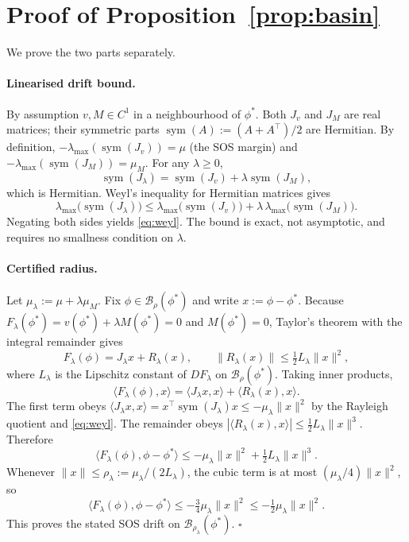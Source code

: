 \documentclass{article}
\theoremstyle{plain}
\theoremstyle{definition}
\theoremstyle{remark}
\newcommand{\B}{\mathcal{B}}
\begin{document}
\section{Proof of Proposition~\ref{prop:basin}}\label{app:prop-basin}

We prove the two parts separately.

\paragraph{Linearised drift bound.}
By assumption $v,M\in C^1$ in a neighbourhood of $\phi^\ast$. Both $J_v$ and $J_M$ are real matrices; their symmetric parts $\operatorname{sym}(A):=(A+A^\top)/2$ are Hermitian. By definition, $-\lambda_{\max}(\operatorname{sym}(J_v))=\mu$ (the SOS margin) and $-\lambda_{\max}(\operatorname{sym}(J_M))=\mu_M$. For any $\lambda\ge 0$,
\[
\operatorname{sym}(J_\lambda)=\operatorname{sym}(J_v)+\lambda\operatorname{sym}(J_M),
\]
which is Hermitian. Weyl's inequality for Hermitian matrices gives
\[
\lambda_{\max}\!\bigl(\operatorname{sym}(J_\lambda)\bigr)\le \lambda_{\max}\!\bigl(\operatorname{sym}(J_v)\bigr)+\lambda\,\lambda_{\max}\!\bigl(\operatorname{sym}(J_M)\bigr).
\]
Negating both sides yields \eqref{eq:weyl}. The bound is exact, not asymptotic, and requires no smallness condition on $\lambda$.

\paragraph{Certified radius.}
Let $\mu_\lambda:=\mu+\lambda\mu_M$. Fix $\phi\in\B_\rho(\phi^\ast)$ and write $x:=\phi-\phi^\ast$. Because $F_\lambda(\phi^\ast)=v(\phi^\ast)+\lambda M(\phi^\ast)=0$ and $M(\phi^\ast)=0$, Taylor's theorem with the integral remainder gives
\[
F_\lambda(\phi)=J_\lambda x+R_\lambda(x),
\qquad
\|R_\lambda(x)\|\le \tfrac{1}{2}L_\lambda\|x\|^2,
\]
where $L_\lambda$ is the Lipschitz constant of $DF_\lambda$ on $\B_\rho(\phi^\ast)$. Taking inner products,
\[
\langle F_\lambda(\phi),x\rangle
=\langle J_\lambda x,x\rangle+\langle R_\lambda(x),x\rangle.
\]
The first term obeys $\langle J_\lambda x,x\rangle=x^\top\operatorname{sym}(J_\lambda)x\le -\mu_\lambda\|x\|^2$ by the Rayleigh quotient and \eqref{eq:weyl}. The remainder obeys $|\langle R_\lambda(x),x\rangle|\le \tfrac{1}{2}L_\lambda\|x\|^3$. Therefore
\[
\langle F_\lambda(\phi),\phi-\phi^\ast\rangle\le -\mu_\lambda\|x\|^2+\tfrac{1}{2}L_\lambda\|x\|^3.
\]
Whenever $\|x\|\le \rho_\lambda:=\mu_\lambda/(2L_\lambda)$, the cubic term is at most $(\mu_\lambda/4)\|x\|^2$, so
\[
\langle F_\lambda(\phi),\phi-\phi^\ast\rangle\le -\tfrac{3}{4}\mu_\lambda\|x\|^2\le -\tfrac{1}{2}\mu_\lambda\|x\|^2.
\]
This proves the stated SOS drift on $\B_{\rho_\lambda}(\phi^\ast)$. $\square$
\end{document}
